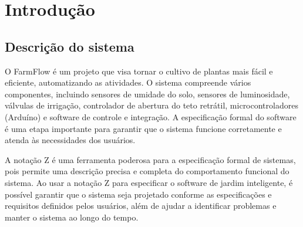 \chapter{Introdução}

	\section{Descrição do sistema}
		O FarmFlow é um projeto que visa tornar o cultivo de plantas mais fácil e eficiente, automatizando as
		atividades. O sistema compreende vários componentes, incluindo sensores de umidade do solo, sensores de
		luminosidade, válvulas de irrigação, controlador de abertura do teto retrátil, microcontroladores (Arduíno) e
		software de controle e integração. A especificação formal do software é uma etapa importante para garantir que
		o sistema funcione corretamente e atenda às necessidades dos usuários.

		A notação Z é uma ferramenta poderosa para a especificação formal de sistemas, pois permite uma descrição
		precisa e completa do comportamento funcional do sistema. Ao usar a notação Z para especificar o software de
		jardim inteligente, é possível garantir que o sistema seja projetado conforme as especificações e requisitos
		definidos pelos usuários, além de ajudar a identificar problemas e manter o sistema ao longo do tempo.


